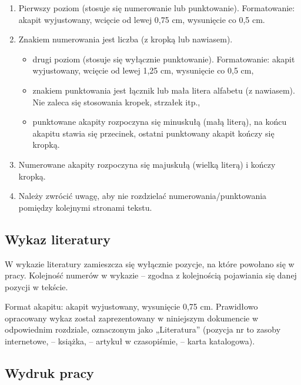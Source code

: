 \documentclass[12pt,twoside]{article}
\begin{document}
\begin{enumerate}[label=\arabic*), leftmargin=1.25cm]
	\item Pierwszy poziom (stosuje się numerowanie lub punktowanie). Formatowanie:
	      akapit wyjustowany, wcięcie od lewej 0,75 cm, wysunięcie co 0,5 cm.
	\item Znakiem numerowania jest liczba (z kropką lub nawiasem).
	      \begin{itemize}[label=-,labelsep=0.4cm,leftmargin=0.6cm]
		      \item drugi poziom (stosuje się wyłącznie punktowanie). Formatowanie: akapit
		            wyjustowany, wcięcie od lewej 1,25 cm, wysunięcie co 0,5 cm,
		      \item znakiem punktowania jest łącznik lub mała litera alfabetu (z nawiasem). Nie
		            zaleca się stosowania kropek, strzałek itp.,
		      \item punktowane akapity rozpoczyna się minuskułą (małą literą), na końcu akapitu
		            stawia się przecinek, ostatni punktowany akapit kończy się kropką.
	      \end{itemize}
	\item Numerowane akapity rozpoczyna się majuskułą (wielką literą) i kończy kropką.
	\item Należy zwrócić uwagę, aby nie rozdzielać numerowania/punktowania pomiędzy
	      kolejnymi stronami tekstu.
\end{enumerate}


\subsection{Wykaz literatury}

W wykazie literatury zamieszcza się wyłącznie pozycje, na które powołano się
w pracy. Kolejność numerów w wykazie – zgodna z kolejnością pojawiania się danej
pozycji w tekście.

Format akapitu: akapit wyjustowany, wysunięcie 0,75 cm. Prawidłowo opracowany
wykaz został zaprezentowany w niniejszym dokumencie w odpowiednim rozdziale, oznaczonym jako „Literatura”  (pozycja nr \cite{str} to zasoby internetowe,
\cite{Jakubczyk1997} – książka, \cite{Barski2011} – artykuł w czasopiśmie, \cite{dokum} – karta katalogowa).

	{\subsection{Wydruk pracy}}
\end{document}
